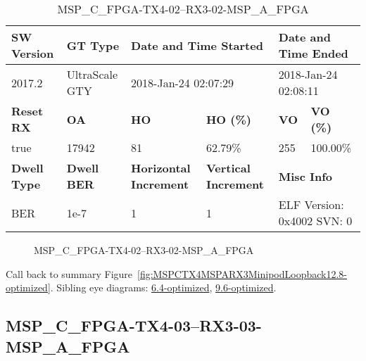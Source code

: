 \begin{table}[h]
\centering
\caption{MSP\_C\_FPGA-TX4-02--RX3-02-MSP\_A\_FPGA}
\label{tab:MSPCFPGATX402RX302MSPAFPGA12.8-optimized}
\begin{tabular}{@{}|l|l|l|l|l|l|@{}}
\toprule
\textbf{SW Version}                & \textbf{GT Type}   & \multicolumn{2}{l|}{\textbf{Date and Time Started}}            & \multicolumn{2}{l|}{\textbf{Date and Time Ended}}        \\ \midrule
2017.2                       & UltraScale GTY          & \multicolumn{2}{l|}{2018-Jan-24 02:07:29}                   & \multicolumn{2}{l|}{2018-Jan-24 02:08:11}               \\ \midrule
\textbf{Reset RX}                  & \textbf{OA} & \textbf{HO}   & \textbf{HO (\%)} & \textbf{VO} & \textbf{VO (\%)} \\ \midrule
true & 17942        & 81          & 62.79\%        & 255        & 100.00\%       \\ \midrule
\textbf{Dwell Type}                & \textbf{Dwell BER} & \textbf{Horizontal Increment} & \textbf{Vertical Increment}    & \multicolumn{2}{l|}{\textbf{Misc Info}}                  \\ \midrule
BER                            & 1e-7        & 1        & 1           & \multicolumn{2}{l|}{ELF Version: 0x4002 SVN: 0}                         \\ \bottomrule
\end{tabular}
\end{table}

\begin{figure}[h]
\caption{MSP\_C\_FPGA-TX4-02--RX3-02-MSP\_A\_FPGA} \label{fig:MSPCFPGATX402RX302MSPAFPGA12.8-optimized}
\end{figure}

Call back to summary Figure~\ref{fig:MSPCTX4MSPARX3MinipodLoopback12.8-optimized}.
Sibling eye diagrams: \hyperref[sec:MSPCFPGATX402RX302MSPAFPGA6.4-optimized]{6.4-optimized}, \hyperref[sec:MSPCFPGATX402RX302MSPAFPGA9.6-optimized]{9.6-optimized}.

\clearpage
\newpage


\subsection{MSP\_C\_FPGA-TX4-03--RX3-03-MSP\_A\_FPGA}\label{sec:MSPCFPGATX403RX303MSPAFPGA12.8-optimized}

